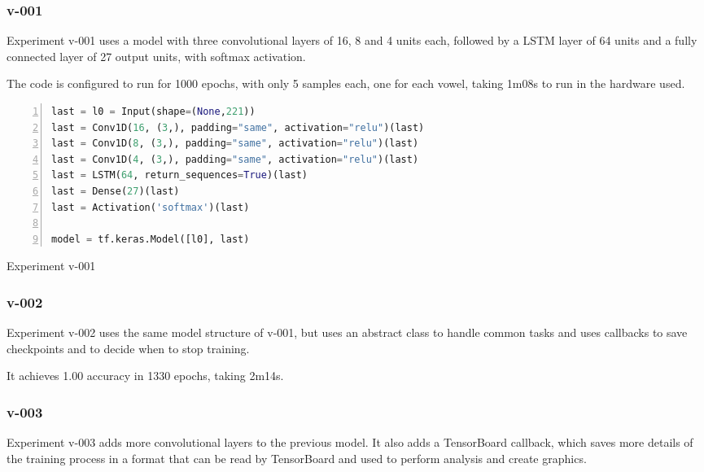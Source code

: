 

\subsubsection{v-001}

Experiment v-001 uses a model with three convolutional layers of 16, 8 and 4 units each, followed by a LSTM layer of 64 units and a fully connected layer of 27 output units, with softmax activation.

The code is configured to run for 1000 epochs, with only 5 samples each, one for each vowel, taking 1m08s to run in the hardware used.

\noindent
\begin{algorithm}
\begin{lstlisting}[language=Python, frame=single, numbers=left]
last = l0 = Input(shape=(None,221))
last = Conv1D(16, (3,), padding="same", activation="relu")(last)
last = Conv1D(8, (3,), padding="same", activation="relu")(last)
last = Conv1D(4, (3,), padding="same", activation="relu")(last)
last = LSTM(64, return_sequences=True)(last)
last = Dense(27)(last)
last = Activation('softmax')(last)

model = tf.keras.Model([l0], last)
\end{lstlisting}
\caption{\label{alg:v001}Experiment v-001}
\end{algorithm}

\subsubsection{v-002}
Experiment v-002 uses the same model structure of v-001, but uses an abstract class to handle common tasks and uses callbacks to save checkpoints and to decide when to stop training.

It achieves 1.00 accuracy in 1330 epochs, taking 2m14s.

\subsubsection{v-003}

Experiment v-003 adds more convolutional layers to the previous model.  It also adds a TensorBoard callback, which saves more details of the training process in a format that can be read by TensorBoard and used to perform analysis and create graphics.

